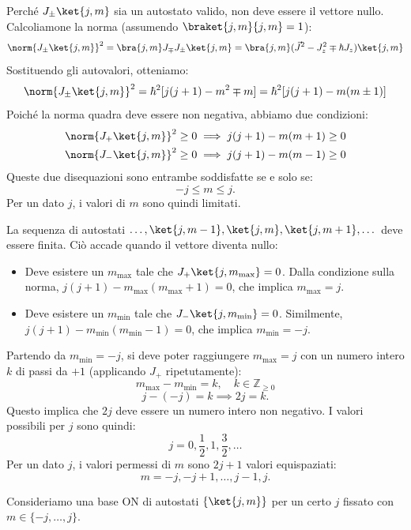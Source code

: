 Perché \(J_\pm \ket{j, m}\) sia un autostato valido, non deve essere il vettore nullo. Calcoliamone la norma (assumendo \(\braket{j, m}{j, m} = 1\)):
\[
    \norm{J_\pm \ket{j, m}}^2 = \bra{j, m} J_\mp J_\pm \ket{j, m}
    = \bra{j, m} (\vec{J}^2 - J_z^2 \mp \hbar J_z) \ket{j, m}
\]
Sostituendo gli autovalori, otteniamo:
\[
    \norm{J_\pm \ket{j, m}}^2 = \hbar^2 [j(j+1) - m^2 \mp m]
    = \hbar^2 [j(j+1) - m(m \pm 1)]
\]
Poiché la norma quadra deve essere non negativa, abbiamo due condizioni:
\begin{align*}
    \norm{J_+ \ket{j,m}}^2 \ge 0 \implies j(j+1) - m(m+1) \ge 0 \\
    \norm{J_- \ket{j,m}}^2 \ge 0 \implies j(j+1) - m(m-1) \ge 0
\end{align*}
Queste due disequazioni sono entrambe soddisfatte se e solo se:
\begin{equation}
    -j \le m \le j.
\end{equation}
Per un dato \(j\), i valori di \(m\) sono quindi limitati.

La sequenza di autostati \(\dots, \ket{j, m-1}, \ket{j, m}, \ket{j, m+1}, \dots\) deve essere finita.
Ciò accade quando il vettore diventa nullo:
\begin{itemize}
    \item Deve esistere un \(m_\text{max}\) tale che \(J_+ \ket{j, m_\text{max}} = 0\).
    Dalla condizione sulla norma, \(j(j+1) - m_\text{max}(m_\text{max}+1) = 0\), che implica \(m_\text{max} = j\).
    \item Deve esistere un \(m_\text{min}\) tale che \(J_- \ket{j, m_\text{min}} = 0\).
    Similmente, \(j(j+1) - m_\text{min}(m_\text{min}-1) = 0\), che implica \(m_\text{min} = -j\).
\end{itemize}
Partendo da \(m_\text{min} = -j\), si deve poter raggiungere \(m_\text{max} = j\) con un numero intero \(k\) di passi da \(+1\) (applicando \(J_+\) ripetutamente):
\[
    m_\text{max} - m_\text{min} = k, \quad k \in \mathbb{Z}_{\ge 0}
\]
\[
    j - (-j) = k \implies 2j = k.
\]
Questo implica che \(2j\) deve essere un numero intero non negativo. I valori possibili per \(j\) sono quindi:
\[
    j = 0, \frac{1}{2}, 1, \frac{3}{2}, \dots
\]
Per un dato \(j\), i valori permessi di \(m\) sono \(2j+1\) valori equispaziati:
\[
    m = -j, -j+1, \dots, j-1, j.
\]




Consideriamo una base ON di autostati \(\left\{ \ket{j,m} \right\} \)  per un certo \( j\) fissato con \(m \in \{-j, \dots, j\}\).

